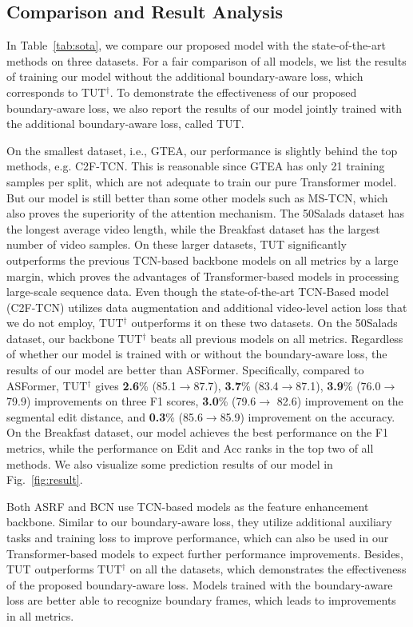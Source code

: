 \documentclass[letterpaper]{article} \usepackage[submission]{aaai23}  \usepackage{times}  \usepackage{helvet}  \usepackage{courier}  \usepackage[hyphens]{url}  \usepackage{graphicx} \urlstyle{rm} \def\UrlFont{\rm}  \usepackage{natbib}  \usepackage{caption} \frenchspacing  \setlength{\pdfpagewidth}{8.5in} \setlength{\pdfpageheight}{11in} \usepackage{algorithm}
\begin{document}
\subsection{Comparison and Result Analysis}

In Table~\ref{tab:sota}, we compare our proposed model with the state-of-the-art methods on three datasets. For a fair comparison of all models, we list the results of training our model without the additional boundary-aware loss, which corresponds to TUT$^\dag$. To demonstrate the effectiveness of our proposed boundary-aware loss, we also report the results of our model jointly trained with the additional boundary-aware loss, called TUT.

On the smallest dataset, i.e., GTEA, our performance is slightly behind the top methods, e.g. C2F-TCN. This is reasonable since GTEA has only 21 training samples per split, which are not adequate to train our pure Transformer model. But our model is still better than some other models such as MS-TCN, which also proves the superiority of the attention mechanism. The 50Salads dataset has the longest average video length, while the Breakfast dataset has the largest number of video samples. On these larger datasets, TUT significantly outperforms the previous TCN-based backbone models on all metrics by a large margin, which proves the advantages of Transformer-based models in processing large-scale sequence data. Even though the state-of-the-art TCN-Based model (C2F-TCN) utilizes data augmentation and additional video-level action loss that we do not employ, TUT$^\dag$ outperforms it on these two datasets. On the 50Salads dataset, our backbone TUT$^\dag$ beats all previous models on all metrics. Regardless of whether our model is trained with or without the boundary-aware loss, the results of our model are better than ASFormer. Specifically, compared to ASFormer, TUT$^\dag$ gives \textbf{2.6}\% (85.1$\to$87.7), \textbf{3.7}\% (83.4$\to$87.1), \textbf{3.9}\% (76.0$\to$79.9) improvements on three F1 scores, \textbf{3.0}\% (79.6$\to$ 82.6) improvement on the segmental edit distance, and \textbf{0.3}\% (85.6$\to$85.9) improvement on the accuracy. On the Breakfast dataset, our model achieves the best performance on the F1 metrics, while the performance on Edit and Acc ranks in the top two of all methods. We also visualize some prediction results of our model in Fig.~\ref{fig:result}. 

Both ASRF and BCN use TCN-based models as the feature enhancement backbone. Similar to our boundary-aware loss, they utilize additional auxiliary tasks and training loss to improve performance, which can also be used in our Transformer-based models to expect further performance improvements. Besides, TUT outperforms TUT$^\dag$ on all the datasets, which demonstrates the effectiveness of the proposed boundary-aware loss. Models trained with the boundary-aware loss are better able to recognize boundary frames, which leads to improvements in all metrics.
\end{document}
